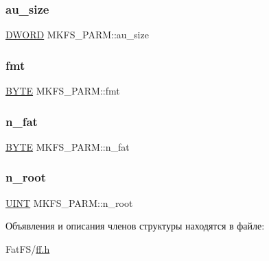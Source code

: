 \mbox{\label{struct_m_k_f_s___p_a_r_m_adb29b0af8e486fc53d8b629c3e49d567}} 
\subsubsection{\texorpdfstring{au\_size}{au\_size}}
{\footnotesize\ttfamily \mbox{\hyperlink{ff_8h_ad342ac907eb044443153a22f964bf0af}{D\+W\+O\+RD}} M\+K\+F\+S\+\_\+\+P\+A\+R\+M\+::au\+\_\+size}

\mbox{\label{struct_m_k_f_s___p_a_r_m_a54cb609ecff9f1586f3628b00aeb8f23}} 
\subsubsection{\texorpdfstring{fmt}{fmt}}
{\footnotesize\ttfamily \mbox{\hyperlink{ff_8h_a4ae1dab0fb4b072a66584546209e7d58}{B\+Y\+TE}} M\+K\+F\+S\+\_\+\+P\+A\+R\+M\+::fmt}

\mbox{\label{struct_m_k_f_s___p_a_r_m_a0ff8e4728bddfe0636c50367af399e25}} 
\subsubsection{\texorpdfstring{n\_fat}{n\_fat}}
{\footnotesize\ttfamily \mbox{\hyperlink{ff_8h_a4ae1dab0fb4b072a66584546209e7d58}{B\+Y\+TE}} M\+K\+F\+S\+\_\+\+P\+A\+R\+M\+::n\+\_\+fat}

\mbox{\label{struct_m_k_f_s___p_a_r_m_a2b8a26b614381e0c2e0ff26f138feea6}} 
\subsubsection{\texorpdfstring{n\_root}{n\_root}}
{\footnotesize\ttfamily \mbox{\hyperlink{ff_8h_a36cb3b01d81ffd844bbbfb54003e06ec}{U\+I\+NT}} M\+K\+F\+S\+\_\+\+P\+A\+R\+M\+::n\+\_\+root}



Объявления и описания членов структуры находятся в файле\+:\begin{DoxyCompactItemize}
\item 
Fat\+F\+S/\mbox{\hyperlink{ff_8h}{ff.\+h}}\end{DoxyCompactItemize}
